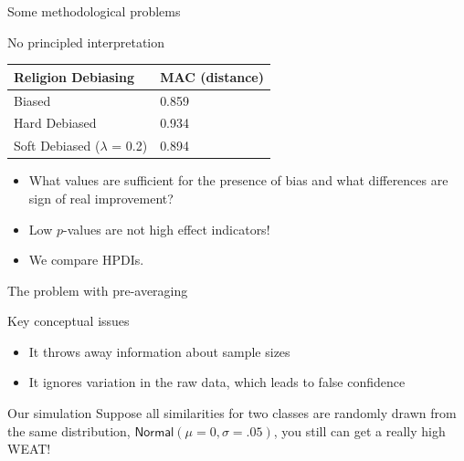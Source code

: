 \documentclass[
  10pt,
  ignorenonframetext,
  x11names, dvipsnames, bibspacing,natbib]{beamer}
\providecommand{\tightlist}{%
  \setlength{\itemsep}{0pt}\setlength{\parskip}{0pt}}
\begin{document}
\begin{frame}{Some methodological problems}
\protect\hypertarget{some-methodological-problems-5}{}
\begin{block}{No principled interpretation}
\protect\hypertarget{no-principled-interpretation}{}
\begin{longtable}[]{@{}ll@{}}
\toprule
Religion Debiasing & MAC (distance) \\
\midrule
\endhead
Biased & 0.859 \\
Hard Debiased & 0.934 \\
Soft Debiased (\(\lambda\) = 0.2) & 0.894 \\
\bottomrule
\end{longtable}

\begin{itemize}
\item
  What values are sufficient for the presence of bias and what
  differences are sign of real improvement?
\item
  Low \(p\)-values are not high effect indicators!
\item
  We compare HPDIs.
\end{itemize}
\end{block}
\end{frame}

\begin{frame}{The problem with pre-averaging}
\protect\hypertarget{the-problem-with-pre-averaging}{}
\begin{block}{Key conceptual issues}
\protect\hypertarget{key-conceptual-issues}{}
\begin{itemize}
\tightlist
\item
  It throws away information about sample sizes
\item
  It ignores variation in the raw data, which leads to false confidence
\end{itemize}

\pause
\end{block}

\begin{block}{Our simulation}
\protect\hypertarget{our-simulation}{}
Suppose all similarities for two classes are randomly drawn from the
same distribution, \(\mathsf{Normal}(\mu = 0, \sigma = .05)\), you still
can get a really high WEAT!
\end{block}
\end{frame}
\end{document}
